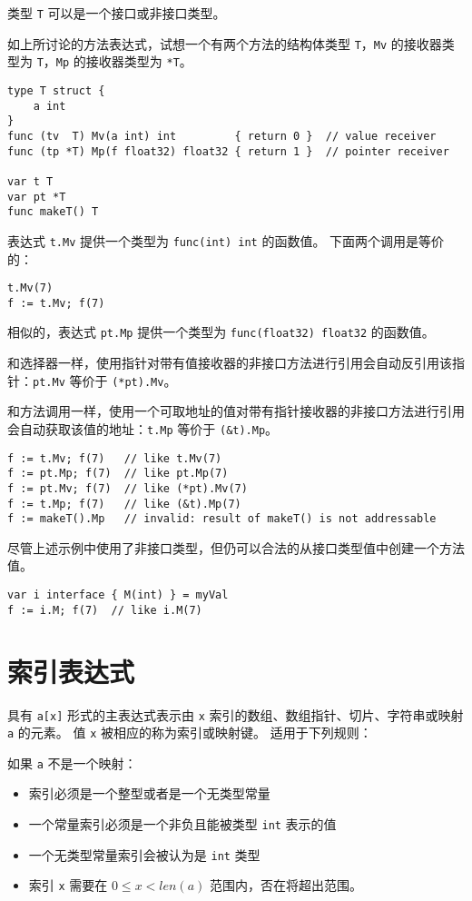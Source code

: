 类型 \lstinline|T| 可以是一个接口或非接口类型。

如上所讨论的方法表达式，试想一个有两个方法的结构体类型 \lstinline|T|，\lstinline|Mv| 的接收器类型为 \lstinline|T|，\lstinline|Mp| 的接收器类型为 \lstinline|*T|。
\begin{lstlisting}[style=golang]
type T struct {
	a int
}
func (tv  T) Mv(a int) int         { return 0 }  // value receiver
func (tp *T) Mp(f float32) float32 { return 1 }  // pointer receiver

var t T
var pt *T
func makeT() T
\end{lstlisting} 
表达式 \lstinline|t.Mv| 提供一个类型为 \lstinline[style=golang]|func(int) int| 的函数值。
下面两个调用是等价的：
\begin{lstlisting}[style=golang]
t.Mv(7)
f := t.Mv; f(7)
\end{lstlisting}
相似的，表达式 \lstinline|pt.Mp| 提供一个类型为 \lstinline[style=golang]|func(float32) float32| 的函数值。

和选择器一样，使用指针对带有值接收器的非接口方法进行引用会自动反引用该指针：\lstinline|pt.Mv| 等价于 \lstinline|(*pt).Mv|。

和方法调用一样，使用一个可取地址的值对带有指针接收器的非接口方法进行引用会自动获取该值的地址：\lstinline|t.Mp| 等价于 \lstinline|(&t).Mp|。
\begin{lstlisting}[style=golang]
f := t.Mv; f(7)   // like t.Mv(7)
f := pt.Mp; f(7)  // like pt.Mp(7)
f := pt.Mv; f(7)  // like (*pt).Mv(7)
f := t.Mp; f(7)   // like (&t).Mp(7)
f := makeT().Mp   // invalid: result of makeT() is not addressable
\end{lstlisting}
尽管上述示例中使用了非接口类型，但仍可以合法的从接口类型值中创建一个方法值。
\begin{lstlisting}[style=golang]
var i interface { M(int) } = myVal
f := i.M; f(7)  // like i.M(7)
\end{lstlisting}

\section{索引表达式}
具有 \lstinline|a[x]| 形式的主表达式表示由 \lstinline|x| 索引的数组、数组指针、切片、字符串或映射 \lstinline|a| 的元素。
值 \lstinline|x| 被相应的称为索引或映射键。
适用于下列规则：

如果 \lstinline|a| 不是一个映射：
\begin{itemize}
\item 索引必须是一个整型或者是一个无类型常量
\item 一个常量索引必须是一个非负且能被类型 \lstinline|int| 表示的值
\item 一个无类型常量索引会被认为是 \lstinline|int| 类型
\item 索引 \lstinline|x| 需要在 $0 \leq x < len(a)$ 范围内，否在将超出范围。
\end{itemize}

